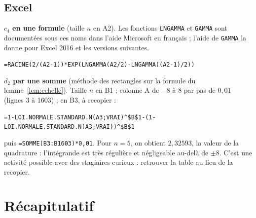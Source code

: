 \documentclass[11pt,a4paper]{article}
\theoremstyle{tq}
\theoremstyle{remark}
\begin{document}
\subsection{Excel}
\textbf{$c_4$ en une formule} (taille $n$ en A2). Les fonctions \texttt{LNGAMMA} et \texttt{GAMMA} sont documentées sous ces noms dans l'aide Microsoft en français ; l'aide de \texttt{GAMMA} la donne pour Excel 2016 et les versions suivantes.
\begin{center}
\texttt{=RACINE(2/(A2-1))*EXP(LNGAMMA(A2/2)-LNGAMMA((A2-1)/2))}
\end{center}
\textbf{$d_2$ par une somme} (méthode des rectangles sur la formule du lemme~\ref{lem:echelle}). Taille $n$ en B1 ; colonne A de $-8$ à $8$ par pas de $0{,}01$ (lignes 3 à 1603) ; en B3, à recopier :
\begin{center}\small
\texttt{=1-LOI.NORMALE.STANDARD.N(A3;VRAI)\^{}\$B\$1-(1-LOI.NORMALE.STANDARD.N(A3;VRAI))\^{}\$B\$1}
\end{center}
puis \texttt{=SOMME(B3:B1603)*0,01}. Pour $n=5$, on obtient $2{,}32593$, la valeur de la quadrature : l'intégrande est très régulière et négligeable au-delà de $\pm8$. C'est une activité possible avec des stagiaires curieux : retrouver la table au lieu de la recopier.

\section{Récapitulatif}
\end{document}
